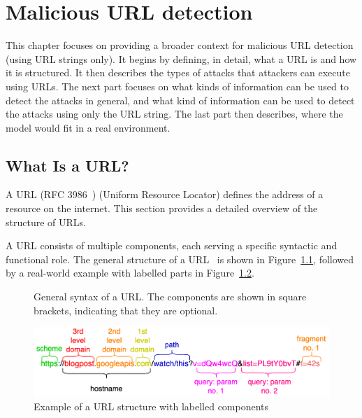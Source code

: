 \chapter{Malicious URL detection}

This chapter focuses on providing a broader context for malicious URL detection (using URL strings only). It begins by defining, in detail, what a URL is and how it is structured. It then describes the types of attacks that attackers can execute using URLs. The next part focuses on what kinds of information can be used to detect the attacks in general, and what kind of information can be used to detect the attacks using only the URL string. The last part then describes, where the model would fit in a real environment.

\section{What Is a URL?}

A URL (RFC 3986~\cite{rfc3986}) (Uniform Resource Locator) defines the address of a resource on the internet. This section provides a detailed overview of the structure of URLs.

A URL consists of multiple components, each serving a specific syntactic and functional role. The general structure of a URL~\cite{rfc3986} is shown in Figure~\ref{fig:url_syntax}, followed by a real-world example with labelled parts in Figure~\ref{fig:url_structure_example}.

\begin{figure}[H]
    \centering
    \caption{General syntax of a URL. The components are shown in square brackets, indicating that they are optional.}
    \label{fig:url_syntax}
\end{figure}

\begin{figure}[H]
    \centering
    \includegraphics[width=1\textwidth]{images/url_structure_example.png}
    \caption{Example of a URL structure with labelled components}
    \label{fig:url_structure_example}
\end{figure}


